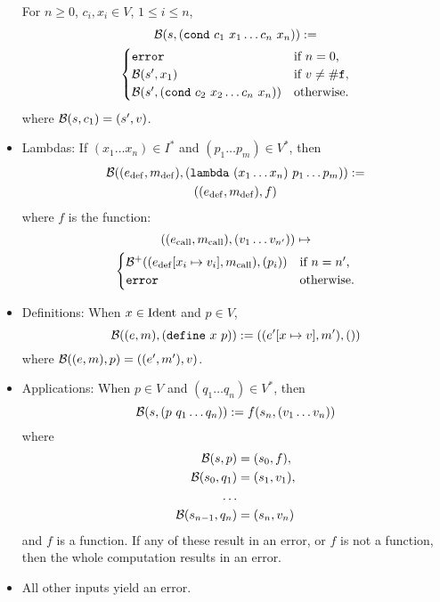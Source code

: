 \begin{itemize}
  For $n \geq 0$, $c_i, x_i \in V$, $1 \leq i \leq n$,
  \begin{multline*}
    \mathcal{B}(s, (\mathtt{cond} \ c_1 \ x_1 \ldots c_n \ x_n)) :=\\
    \begin{cases}
      \mathtt{error} & \text{if $n = 0$,}\\
      \mathcal{B}(s', x_1) & \text{if $v \neq \#\mathtt{f}$,}\\
      \mathcal{B}(s', (\mathtt{cond} \ c_2 \ x_2 \ldots c_n \ x_n)) & \text{otherwise}.
    \end{cases}
  \end{multline*}
  where $\mathcal{B}(s, c_1) = (s', v)$.
\item
  \def\defe{\mathrm{def}}
  \def\calle{\mathrm{call}}
  \def\rete{\mathrm{rete}}
  Lambdas: If $(x_1 \ldots x_n) \in I^*$ and $(p_1 \ldots p_m) \in V^*$, then
  \begin{multline*}
    \B((e_\defe, m_\defe), (\mathtt{lambda} \ (x_1 \ldots x_n) \ p_1 \ldots p_m)) :=\\
    ((e_\defe,m_\defe), f)
  \end{multline*}
  where $f$ is the function:
  \begin{multline*}
    ((e_\calle,m_\calle), (v_1 \ldots v_{n'})) \mapsto\\
    \begin{cases}
      \B^+((e_\defe[x_i \mapsto v_i], m_\calle), (p_i)) & \text{if $n = n'$,}\\
      \mathtt{error} & \text{otherwise.}
    \end{cases}
  \end{multline*}
\item Definitions: When $x \in \mathrm{Ident}$ and $p \in V$,
\[
\mathcal{B}((e,m), (\mathtt{define} \ x \ p)) := ((e'[x \mapsto v], m'), ())
\]
where $\mathcal{B}((e,m), p) = ((e', m'), v)$.
\item Applications: When $p \in V$ and $(q_1 \ldots q_n) \in V^*$, then
\[
\mathcal{B}(s, (p \ q_1 \ldots q_n)) := f(s_n, (v_1 \ldots v_n))
\]
where
\begin{align*}
  \mathcal{B}(s, p) &= (s_0, f),\\
  \mathcal{B}(s_0, q_1) &= (s_1, v_1),\\
  \ldots\\
  \mathcal{B}(s_{n-1}, q_n) &= (s_n, v_n)
\end{align*}
and $f$ is a function. If any of these result in an error, or $f$ is not a
function, then the whole computation results in an error.
\item All other inputs yield an error.
\end{itemize}

